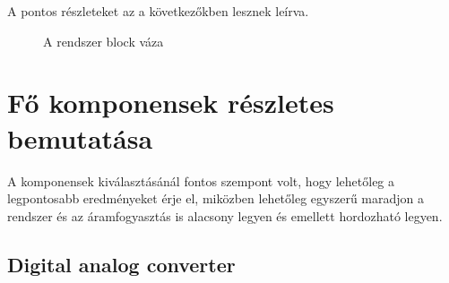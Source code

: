 A pontos részleteket az a következőkben lesznek leírva.

\begin{figure}[H]
    \centering
    \caption{A rendszer block váza}
    \label{fig:blockDiagramm}
\end{figure}

\section{Fő komponensek részletes bemutatása}

A komponensek kiválasztásánál fontos szempont volt, hogy lehetőleg a legpontosabb 
eredményeket érje el, miközben lehetőleg egyszerű maradjon a rendszer és az áramfogyasztás 
is alacsony legyen és emellett hordozható legyen.

\subsection{Digital analog converter}
